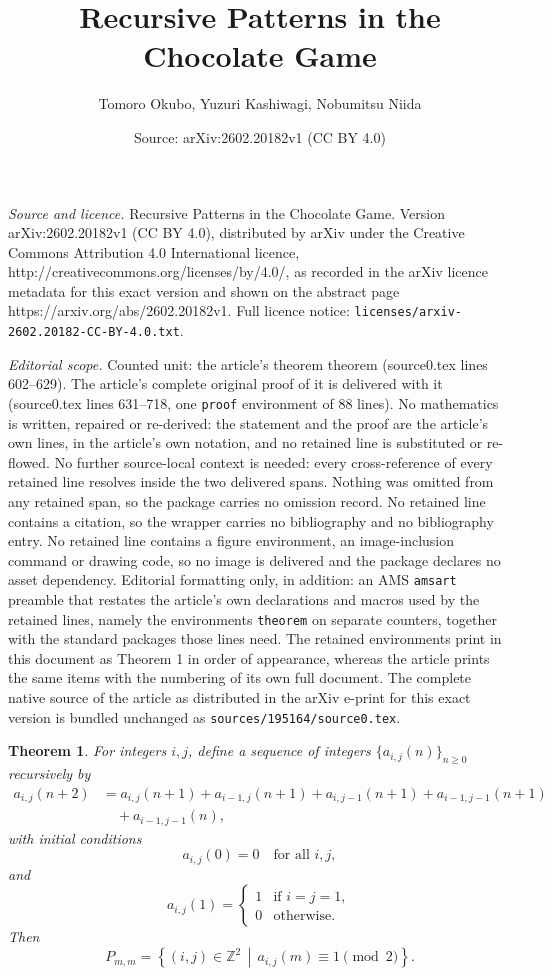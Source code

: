 \documentclass[10pt,a4paper]{amsart}
\title{Recursive Patterns in the Chocolate Game}
\author{Tomoro Okubo, Yuzuri Kashiwagi, Nobumitsu Niida}
\date{Source: arXiv:2602.20182v1 (CC BY 4.0)}
\newtheorem{theorem}{Theorem}
\begin{document}
\maketitle

\noindent\emph{Source and licence.} Recursive Patterns in the Chocolate Game. Version arXiv:2602.20182v1 (CC BY 4.0), distributed by arXiv under the Creative Commons Attribution 4.0 International licence, http://creativecommons.org/licenses/by/4.0/, as recorded in the arXiv licence metadata for this exact version and shown on the abstract page https://arxiv.org/abs/2602.20182v1. Full licence notice: \texttt{licenses/arxiv-2602.20182-CC-BY-4.0.txt}.\par\smallskip

\noindent\textit{Editorial scope.} Counted unit: the article's theorem theorem (source0.tex lines 602--629). The article's complete original proof of it is delivered with it (source0.tex lines 631--718, one \texttt{proof} environment of 88 lines). No mathematics is written, repaired or re-derived: the statement and the proof are the article's own lines, in the article's own notation, and no retained line is substituted or re-flowed.  No further source-local context is needed: every cross-reference of every retained line resolves inside the two delivered spans.  Nothing was omitted from any retained span, so the package carries no omission record.  No retained line contains a citation, so the wrapper carries no bibliography and no bibliography entry.  No retained line contains a figure environment, an image-inclusion command or drawing code, so no image is delivered and the package declares no asset dependency.  Editorial formatting only, in addition: an AMS \texttt{amsart} preamble that restates the article's own declarations and macros used by the retained lines, namely the environments \texttt{theorem} on separate counters, together with the standard packages those lines need.  The retained environments print in this document as Theorem 1 in order of appearance, whereas the article prints the same items with the numbering of its own full document.  The complete native source of the article as distributed in the arXiv e-print for this exact version is bundled unchanged as \texttt{sources/195164/source0.tex}.
\begin{theorem}
For integers $i,j$, define a sequence of integers $\{ a_{i,j}(n) \}_{n \ge 0}$ recursively by
\begin{align*}
a_{i,j}(n+2) &=
a_{i,j}(n+1) + a_{i-1,j}(n+1) + a_{i,j-1}(n+1) + a_{i-1,j-1}(n+1) \\
&\quad + a_{i-1,j-1}(n),
\end{align*}
with initial conditions
\[
a_{i,j}(0) = 0 \quad \text{for all } i,j,
\]
and
\[
a_{i,j}(1) =
\begin{cases}
1 & \text{if } i=j=1, \\
0 & \text{otherwise}.
\end{cases}
\]
Then
\[
P_{m,m}
=
\left\{ (i,j) \in \mathbb{Z}^2 \,\middle|\,
a_{i,j}(m) \equiv 1 \pmod{2}
\right\}.
\]
\end{theorem}
\end{document}

